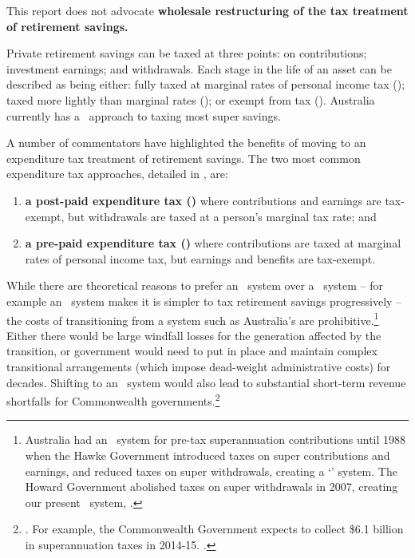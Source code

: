 This report does not advocate \textbf{wholesale restructuring of the tax treatment of retirement savings. }

Private retirement savings can be taxed at three points: on contributions; investment earnings; and withdrawals. Each stage in the life of an asset can be described as being either: fully taxed at marginal rates of personal income tax (\taxabbrevT); taxed more lightly than marginal rates (\taxabbrevt); or exempt from tax (\taxabbrevE). Australia currently has a \ttE\ approach to taxing most super savings.

A number of commentators have highlighted the benefits of moving to an expenditure tax treatment of retirement savings.  The two most common expenditure tax approaches, detailed in , are: 
\begin{enumerate}
\item \textbf{a post-paid expenditure tax (\EET)} where contributions and earnings are tax-exempt, but withdrawals are taxed at a person's marginal tax rate; and
\item \textbf{a pre-paid expenditure tax (\TEE)} where contributions are taxed at marginal rates of personal income tax, but earnings and benefits are tax-exempt. 
\end{enumerate}

While there are theoretical reasons to prefer an \EET\ system over a \TEE\ system – for example an \EET\ system makes it is simpler to tax retirement savings progressively – the costs of transitioning from a system such as Australia’s are prohibitive.\footnote{Australia had an \EET\ system for pre-tax superannuation contributions until 1988 when the Hawke Government introduced taxes on super contributions and earnings, and reduced taxes on super withdrawals, creating a `\ttt' system. The Howard Government abolished taxes on super withdrawals in 2007, creating our present \ttE\ system, \textcite[][44]{Treasury2008RetirementIncomeConsultPaper}.} Either there would be large windfall losses for the generation affected by the transition, or government would need to put in place and maintain complex transitional arrangements (which impose dead-weight administrative costs) for decades. Shifting to an \EET\ system would also lead to substantial short-term revenue shortfalls for Commonwealth governments.\footnote{\textcite{Mercer2015SubmissionToReThink}. For example, the Commonwealth Government expects to collect \$6.1 billion in superannuation taxes in 2014-15. \textcite[][5]{Treasury2015FinalBudgetOutcome1415}.}

